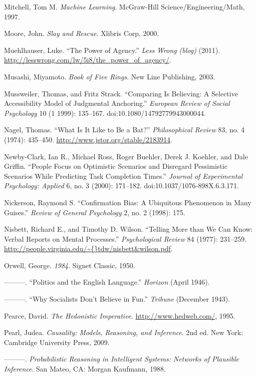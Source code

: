 {
 Mitchell, Tom M. \textit{Machine Learning}. McGraw-Hill
Science/Engineering/Math, 1997.}

{
 Moore, John. \textit{Slay and Rescue}. Xlibris Corp, 2000.}

{
 Muehlhauser, Luke. ``The Power of
Agency.'' \textit{Less Wrong (blog)} (2011).
\url{http://lesswrong.com/lw/5i8/the\_power\_of\_agency/}.}

{
 Musashi, Miyamoto. \textit{Book of Five Rings}. New Line
Publishing, 2003.}

{
 Mussweiler, Thomas, and Fritz Strack. ``Comparing
Is Believing: A Selective Accessibility Model of Judgmental
Anchoring.'' \textit{European Review of Social
Psychology} 10 (1 1999): 135--167. doi:10.1080/14792779943000044.}

{
 Nagel, Thomas. ``What Is It Like to Be a
Bat?'' \textit{Philosophical Review} 83, no. 4
(1974): 435--450. \url{http://www.jstor.org/stable/2183914}.}

{
 Newby-Clark, Ian R., Michael Ross, Roger Buehler, Derek J.
Koehler, and Dale Griffin. ``People Focus on
Optimistic Scenarios and Disregard Pessimistic Scenarios While
Predicting Task Completion Times.'' \textit{Journal
of Experimental Psychology: Applied} 6, no. 3 (2000): 171--182.
doi:10.1037/1076-898X.6.3.171.}

{
 Nickerson, Raymond S. ``Confirmation Bias: A
Ubiquitous Phenomenon in Many Guises.''
\textit{Review of General Psychology} 2, no. 2 (1998): 175.}

{
 Nisbett, Richard E., and Timothy D. Wilson.
``Telling More than We Can Know: Verbal Reports on
Mental Processes.'' \textit{Psychological Review} 84
(1977): 231--259.
\url{http://people.virginia.edu/\~{}tdw/nisbett\&wilson.pdf}.}

{
 Orwell, George. \textit{1984}. Signet Classic, 1950.}

{
 {}---{}---{}---. ``Politics and the English
Language.'' \textit{Horizon} (April 1946).}

{
 {}---{}---{}---. ``Why Socialists
Don't Believe in Fun.''
\textit{Tribune} (December 1943).}

{
 Pearce, David. \textit{The Hedonistic Imperative}.
\url{http://www.hedweb.com/}, 1995.}

{
 Pearl, Judea. \textit{Causality: Models, Reasoning, and
Inference}. 2nd ed. New York: Cambridge University Press, 2009.}

{
 {}---{}---{}---. \textit{Probabilistic Reasoning in Intelligent
Systems: Networks of Plausible Inference}. San Mateo, CA: Morgan
Kaufmann, 1988.}

